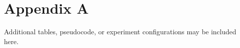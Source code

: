 \section{Appendix A}
Additional tables, pseudocode, or experiment configurations may be included here.